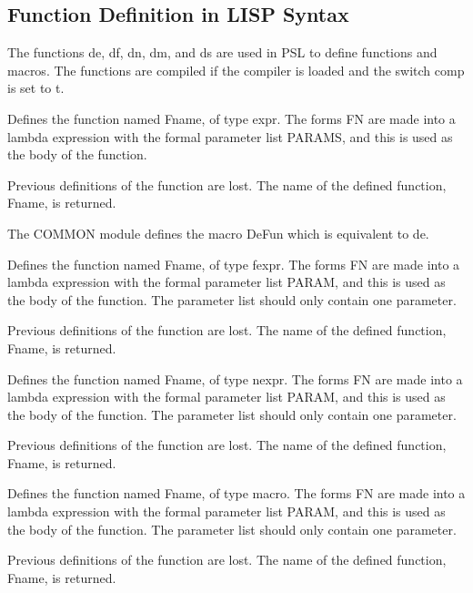 \subsection{Function Definition in LISP Syntax}

  The functions de, df, dn, dm, and ds are used in PSL to define
functions and  macros.    The  functions  are  compiled  if  the
compiler is loaded and the switch comp is set to t.

{    Defines  the  function named Fname, of type expr.  The forms
    FN are  made  into  a  lambda  expression  with  the  formal
    parameter  list  PARAMS, and this is used as the body of the
    function.

    Previous definitions of the function are lost.  The name  of
    the defined function, Fname, is returned.

    The   COMMON   module  defines  the  macro  DeFun  which  is
    equivalent to de.
}

{    Defines the function named Fname, of type fexpr.  The  forms
    FN  are  made  into  a  lambda  expression  with  the formal
    parameter list PARAM, and this is used as the  body  of  the
    function.    The  parameter  list  should  only  contain one
    parameter.

    Previous definitions of the function are lost.  The name  of
    the defined function, Fname, is returned.
}

{    Defines  the function named Fname, of type nexpr.  The forms
    FN are  made  into  a  lambda  expression  with  the  formal
    parameter  list  PARAM,  and this is used as the body of the
    function.   The  parameter  list  should  only  contain  one
    parameter.

    Previous  definitions of the function are lost.  The name of
    the defined function, Fname, is returned.
}

{    Defines the function named Fname, of type macro.  The  forms
    FN  are  made  into  a  lambda  expression  with  the formal
    parameter list PARAM, and this is used as the  body  of  the
    function.    The  parameter  list  should  only  contain one
    parameter.

    Previous definitions of the function are lost.  The name  of
    the defined function, Fname, is returned.
}

